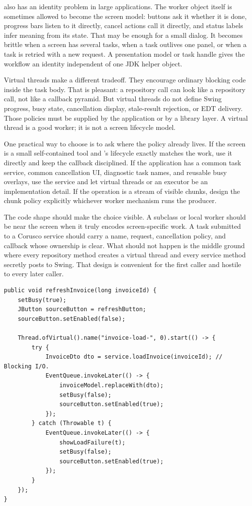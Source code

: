  also has an identity problem in large applications. The worker object itself is sometimes allowed to become the screen model: buttons ask it whether it is done, progress bars listen to it directly, cancel actions call it directly, and status labels infer meaning from its state. That may be enough for a small dialog. It becomes brittle when a screen has several tasks, when a task outlives one panel, or when a task is retried with a new request. A presentation model or task handle gives the workflow an identity independent of one JDK helper object.

Virtual threads make a different tradeoff. They encourage ordinary blocking code inside the task body. That is pleasant: a repository call can look like a repository call, not like a callback pyramid. But virtual threads do not define Swing progress, busy state, cancellation display, stale-result rejection, or EDT delivery. Those policies must be supplied by the application or by a library layer. A virtual thread is a good worker; it is not a screen lifecycle model.

One practical way to choose is to ask where the policy already lives. If the screen is a small self-contained tool and 's lifecycle exactly matches the work, use it directly and keep the callback disciplined. If the application has a common task service, common cancellation UI, diagnostic task names, and reusable busy overlays, use the service and let virtual threads or an executor be an implementation detail. If the operation is a stream of visible chunks, design the chunk policy explicitly whichever worker mechanism runs the producer.

The code shape should make the choice visible. A  subclass or local worker should be near the screen when it truly encodes screen-specific work. A task submitted to a Corusco service should carry a name, request, cancellation policy, and callback whose ownership is clear. What should not happen is the middle ground where every repository method creates a virtual thread and every service method secretly posts to Swing. That design is convenient for the first caller and hostile to every later caller.

\begin{lstlisting}[caption={A virtual-thread handoff pattern that keeps Swing state EDT-confined.}]
public void refreshInvoice(long invoiceId) {
    setBusy(true);
    JButton sourceButton = refreshButton;
    sourceButton.setEnabled(false);

    Thread.ofVirtual().name("invoice-load-", 0).start(() -> {
        try {
            InvoiceDto dto = service.loadInvoice(invoiceId); // Blocking I/O.
            EventQueue.invokeLater(() -> {
                invoiceModel.replaceWith(dto);
                setBusy(false);
                sourceButton.setEnabled(true);
            });
        } catch (Throwable t) {
            EventQueue.invokeLater(() -> {
                showLoadFailure(t);
                setBusy(false);
                sourceButton.setEnabled(true);
            });
        }
    });
}
\end{lstlisting}

